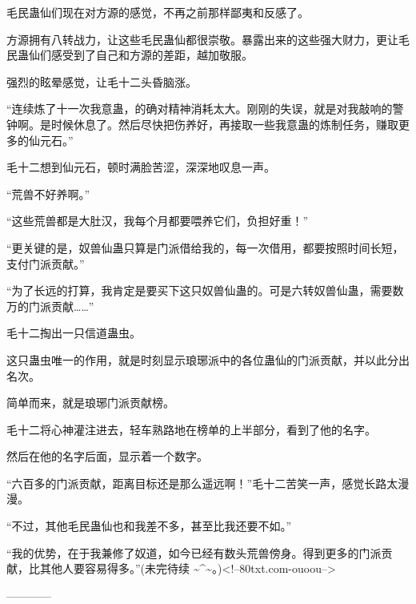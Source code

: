 \begin{this_body}
毛民蛊仙们现在对方源的感觉，不再之前那样鄙夷和反感了。

方源拥有八转战力，让这些毛民蛊仙都很崇敬。暴露出来的这些强大财力，更让毛民蛊仙们感受到了自己和方源的差距，越加敬服。

强烈的眩晕感觉，让毛十二头昏脑涨。

“连续炼了十一次我意蛊，的确对精神消耗太大。刚刚的失误，就是对我敲响的警钟啊。是时候休息了。然后尽快把伤养好，再接取一些我意蛊的炼制任务，赚取更多的仙元石。”

毛十二想到仙元石，顿时满脸苦涩，深深地叹息一声。

“荒兽不好养啊。”

“这些荒兽都是大肚汉，我每个月都要喂养它们，负担好重！”

“更关键的是，奴兽仙蛊只算是门派借给我的，每一次借用，都要按照时间长短，支付门派贡献。”

“为了长远的打算，我肯定是要买下这只奴兽仙蛊的。可是六转奴兽仙蛊，需要数万的门派贡献……”

毛十二掏出一只信道蛊虫。

这只蛊虫唯一的作用，就是时刻显示琅琊派中的各位蛊仙的门派贡献，并以此分出名次。

简单而来，就是琅琊门派贡献榜。

毛十二将心神灌注进去，轻车熟路地在榜单的上半部分，看到了他的名字。

然后在他的名字后面，显示着一个数字。

“六百多的门派贡献，距离目标还是那么遥远啊！”毛十二苦笑一声，感觉长路太漫漫。

“不过，其他毛民蛊仙也和我差不多，甚至比我还要不如。”

“我的优势，在于我兼修了奴道，如今已经有数头荒兽傍身。得到更多的门派贡献，比其他人要容易得多。”(未完待续 \~{}\^{}\~{}。)<!--80txt.com-ouoou-->

------------

\end{this_body}

